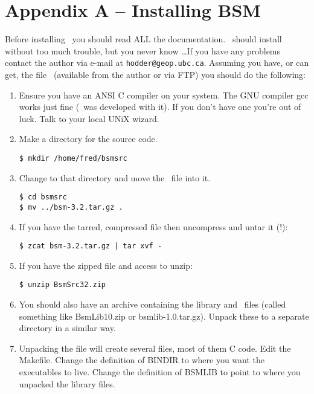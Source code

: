 \documentclass[11pt,twoside]{article}
\begin{document}
\section*{Appendix A -- Installing BSM}

Before installing \bsm\ you should read ALL the documentation. \bsm\ should
install without too much trouble, but you never know \ldots If you have  any
problems contact the author via e-mail at {\tt hodder@geop.ubc.ca}.
Assuming you have, or can get, the file \bsmver\ (available from the
author or via FTP) you should do the following:
\bigskip

\begin{enumerate}
\item Ensure you have an ANSI C compiler on your system.  The GNU  compiler
gcc works just fine (\bsm\ was developed with it). If you don't have one 
you're out of luck. Talk to your local UNiX wizard.

\item Make a directory for the source code.
\begin{verbatim}
$ mkdir /home/fred/bsmsrc
\end{verbatim}

\item Change to that directory and move the \bsmver\ file into it.
\begin{verbatim}
$ cd bsmsrc
$ mv ../bsm-3.2.tar.gz .
\end{verbatim}

\item If you have the tarred, compressed file then uncompress and untar it (!):
\begin{verbatim}
$ zcat bsm-3.2.tar.gz | tar xvf -
\end{verbatim}

\item If you have the zipped file and access to unzip:
\begin{verbatim}
$ unzip BsmSrc32.zip
\end{verbatim}

\item You should also have an archive containing the library \lf and \cmd\
files (called something like BsmLib10.zip or bsmlib-1.0.tar.gz). Unpack these
to a separate directory in a similar way.

\item Unpacking the file will create several files, most of them C code.
Edit the Makefile. Change the definition of BINDIR to where you want the
executables to live. Change the definition of BSMLIB to point to where you
unpacked the library files.


\end{enumerate}
\end{document}

